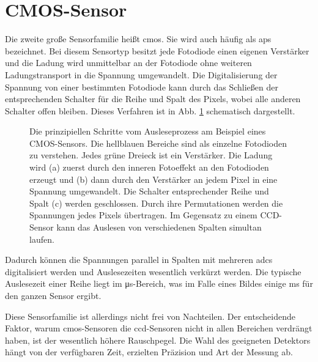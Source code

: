\section{CMOS-Sensor}
\label{text:cmos_theorie}
Die zweite große Sensorfamilie heißt \gls{cmos}. Sie wird auch häufig als \gls{aps} bezeichnet. Bei diesem Sensortyp besitzt jede Fotodiode einen eigenen Verstärker und die Ladung wird unmittelbar an der Fotodiode ohne weiteren Ladungstransport in die Spannung umgewandelt. Die Digitalisierung der Spannung von einer bestimmten Fotodiode kann durch das Schließen der entsprechenden Schalter für die Reihe und Spalt des Pixels, wobei alle anderen Schalter offen bleiben. Dieses Verfahren ist in Abb. \ref{fig:cmos_scheme} schematisch dargestellt.
\begin{figure}[H]
    
    \caption{Die prinzipiellen Schritte vom Ausleseprozess am Beispiel eines  CMOS-Sensors. Die hellblauen Bereiche sind als einzelne Fotodioden zu verstehen. Jedes grüne Dreieck ist ein Verstärker. Die Ladung wird (a) zuerst durch den inneren Fotoeffekt an den Fotodioden erzeugt und (b) dann durch den Verstärker an jedem Pixel in eine Spannung umgewandelt. Die Schalter entsprechender Reihe und Spalt (c) werden geschlossen. Durch ihre Permutationen werden die Spannungen jedes Pixels übertragen. Im Gegensatz zu einem CCD-Sensor kann das Auslesen von verschiedenen Spalten simultan laufen.}
    \label{fig:cmos_scheme}
\end{figure}
\noindent
Dadurch können die Spannungen parallel in Spalten mit mehreren \gls{adc}s digitalisiert werden und Auslesezeiten wesentlich verkürzt werden. Die typische Auslesezeit einer Reihe liegt im \si{\micro\second}-Bereich, was im Falle eines  Bildes einige \si{\milli\second} für den ganzen Sensor ergibt.

\noindent
Diese Sensorfamilie ist allerdings nicht frei von Nachteilen. Der entscheidende Faktor, warum \gls{cmos}-Sensoren die \gls{ccd}-Sensoren nicht in allen Bereichen verdrängt haben, ist der wesentlich höhere Rauschpegel. Die Wahl des geeigneten Detektors hängt von der verfügbaren Zeit, erzielten Präzision und Art der Messung ab.

